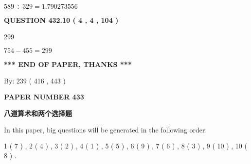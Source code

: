 \documentclass{ctexart}
\begin{document}
 
\noindent{}

$ %
589 \div  %
329=   %
1.790273556$
 
 
  
\vspace{0.2in}
  
{\textbf{\Large{QUESTION
432.10 
 ( 4 , 4 , 104 )
}}}
  
  
 
 
\noindent{}

299
 
 
 
 
\noindent{}

$ %
754 -  %
455=   %
299$
 
 
   
   
 \vspace{0.2in}
 
   
   
   
   
\vspace{1.0in} 
{\textbf{\large{ *** END OF PAPER, THANKS *** }}} 
   
   
\hspace{1.0in} By: 
 239 ( 416 ,  443 )
   
   
   
   
\newpage 
\setcounter{page}{ 
   433001 } 
   
   
   
   
 {\textbf{ \Large{ PAPER NUMBER  433  }}}
   
   
\vspace{0.2in}
   
   
   
   
   
   
 \vspace{0.2in}
{\LARGE {\textbf{ 八道算术和两个选择题}}}
   
   
   
\vspace{0.2in}
   
In this paper, big questions will be generated in the following order: 
   
   
   1 ( 7 )
 ,
   2 ( 4 )
 ,
   3 ( 2 )
 ,
   4 ( 1 )
 ,
   5 ( 5 )
 ,
   6 ( 9 )
 ,
   7 ( 6 )
 ,
   8 ( 3 )
 ,
   9 ( 10 )
 ,
   10 ( 8 )
 .
  
\end{document}
